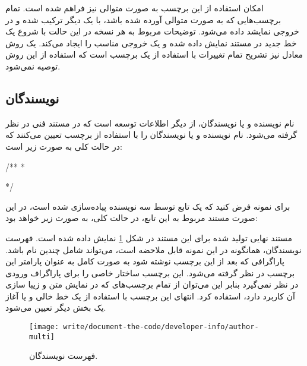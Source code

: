امکان استفاده از این برچسب به صورت متوالی نیز فراهم شده است.
تمام برچسب‌هایی که به صورت متوالی آورده شده باشد، با یک دیگر ترکیب شده و در
خروجی نمایشد داده می‌شود.
توضیحات مربوط به هر نسخه در این حالت با شروع یک خط جدید در مستند نمایش داده شده
و یک خروجی مناسب را ایجاد می‌کند.
یک روش معادل نیز تشریح تمام تغییرات با استفاده از یک برچسب است که استفاده از این
روش توصیه نمی‌شود.


\subsection{نویسندگان}

نام نویسنده و یا نویسندگان، از دیگر اطلاعات توسعه است که در مستند فنی در نظر
گرفته می‌شود.
نام نویسنده و یا نویسندگان را با استفاده از برچسب  تعیین می‌کنند که
در حالت کلی به صورت زیر است:
\begin{C++}
/**
 * \author {list of autohrs}
 */
\end{C++}

برای نمونه فرض کنید که یک تابع توسط سه نویسنده پیاده‌سازی شده است، در این صورت
مستند مربوط به این تابع، در حالت کلی، به صورت زیر خواهد بود:

مستند نهایی تولید شده برای این مستند در شکل
\ref{write/document-the-code/developer-info/author-multi} نمایش داده شده است.
فهرست نویسندگان، همانگونه در این نمونه قابل ملاحضه است، می‌تواند شامل چندین نام
باشد.
پاراگرافی که بعد از این برچسب نوشته شود به صورت کامل به عنوان پارامتر این برچسب
در نظر گرفته می‌شود.
این برچسب ساختار خاصی را برای پاراگراف ورودی در نظر نمی‌گیرد بنابر این می‌توان
از تمام برچسب‌های که در نمایش متن و زیبا سازی آن کاربرد دارد، استفاده کرد.
انتهای این برچسب با استفاده از یک خط خالی و یا آغاز یک بخش دیگر تعیین می‌شود.
\begin{figure}
	\centering
	\texttt{[image: write/document-the-code/developer-info/author-multi]}
	\caption[فهرست نویسندگان]{
		فهرست نویسندگان.
	}
	\label{write/document-the-code/developer-info/author-multi}
\end{figure}


